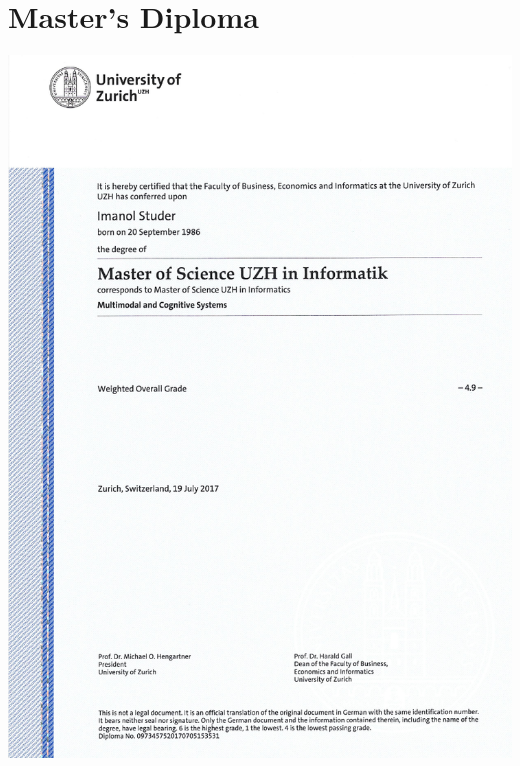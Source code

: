 \enlargethispage{12pt}
\section{Master's Diploma}
\includegraphics[width=\textwidth]{pictures/master/page0.png}
\newpage
